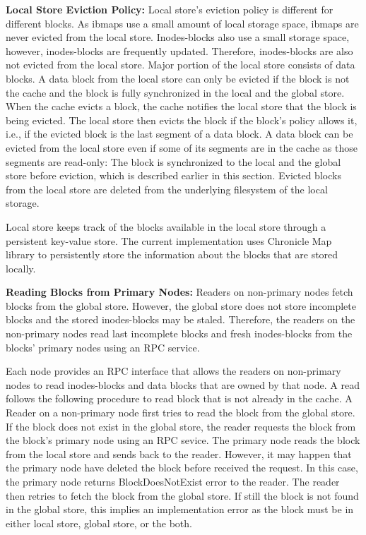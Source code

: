 \documentclass[]{article}
\newcommand{\subtopic}[1]{\vspace{1.5pt} \noindent \textbf{#1}}
\begin{document}
\subtopic{Local Store Eviction Policy:} Local store's eviction policy is
different for different blocks. As ibmaps use a small amount of local storage
space, ibmaps are never evicted from the local store. Inodes-blocks also use a
small storage space, however, inodes-blocks are frequently updated. Therefore,
inodes-blocks are also not evicted from the local store. Major portion of the
local store consists of data blocks.  A data block from the local store can
only be evicted if the block is not the cache and the block is fully
synchronized in the local and the global store.  When the cache evicts a block,
the cache notifies the local store that the block is being evicted. The local
store then evicts the block if the block's policy allows it, i.e., if the
evicted block is the last segment of a data block.  A data block can be evicted
from the local store even if some of its segments are in the cache as those
segments are read-only: The block is synchronized to the local and the global
store before eviction, which is described earlier in this section.
Evicted blocks from the local store are deleted from the underlying filesystem
of the local storage. 

Local store keeps track of the blocks available in the local store through a
persistent key-value store. The current implementation uses Chronicle Map
library to persistently store the information about the blocks that are stored
locally.


\subtopic{Reading Blocks from Primary Nodes:} Readers on non-primary nodes
fetch blocks from the global store.  However, the global store does not store
incomplete blocks and the stored inodes-blocks may be staled. Therefore, the
readers on the non-primary nodes read last incomplete blocks and fresh
inodes-blocks from the blocks' primary nodes using an RPC service.  

Each node provides an RPC interface that allows the readers on non-primary
nodes to read inodes-blocks and data blocks that are owned by that node.  A
read follows the following procedure to read block that is not already in the
cache. A Reader on a non-primary node first tries to read the block from the
global store.  If the block does not exist in the global store, the reader
requests the block from the block's primary node using an RPC sevice. The
primary node reads the block from the local store and sends back to the reader.
However, it may happen that the primary node have deleted the block before
received the request. In this case, the primary node returns BlockDoesNotExist
error to the reader. The reader then retries to fetch the block from the global
store. If still the block is not found in the global store, this implies an
implementation error as the block must be in either local store, global store,
or the both.
\end{document}

